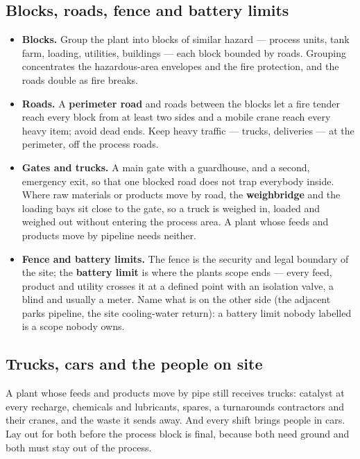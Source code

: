 \documentclass[11pt,a4paper]{article}
\providecommand{\tightlist}{\setlength{\itemsep}{0pt}\setlength{\parskip}{0pt}}
\begin{document}
\hypertarget{blocks-roads-fence-and-battery-limits}{%
\subsection{Blocks, roads, fence and battery
limits}\label{blocks-roads-fence-and-battery-limits}}

\begin{itemize}
\tightlist
\item
  \textbf{Blocks.} Group the plant into blocks of similar hazard ---
  process units, tank farm, loading, utilities, buildings --- each block
  bounded by roads. Grouping concentrates the hazardous-area envelopes
  and the fire protection, and the roads double as fire breaks.
\item
  \textbf{Roads.} A \textbf{perimeter road} and roads between the blocks
  let a fire tender reach every block from at least two sides and a
  mobile crane reach every heavy item; avoid dead ends. Keep heavy
  traffic --- trucks, deliveries --- at the perimeter, off the process
  roads.
\item
  \textbf{Gates and trucks.} A main gate with a guardhouse, and a second,
  emergency exit, so that one blocked road does not trap everybody
  inside. Where raw materials or products move by road, the
  \textbf{weighbridge} and the loading bays sit close to the gate, so a
  truck is weighed in, loaded and weighed out without entering the
  process area. A plant whose feeds and products move by pipeline needs
  neither.
\item
  \textbf{Fence and battery limits.} The fence is the security and legal
  boundary of the site; the \textbf{battery limit} is where the
  plant\textquotesingle s scope ends --- every feed, product and utility
  crosses it at a defined point with an isolation valve, a blind and
  usually a meter. Name what is on the other side (the adjacent
  park\textquotesingle s pipeline, the site cooling-water return): a
  battery limit nobody labelled is a scope nobody owns.
\end{itemize}

\hypertarget{trucks-cars-and-the-people-on-site}{%
\subsection{Trucks, cars and the people on
site}\label{trucks-cars-and-the-people-on-site}}

A plant whose feeds and products move by pipe still receives trucks:
catalyst at every recharge, chemicals and lubricants, spares, a
turnaround\textquotesingle s contractors and their cranes, and the waste
it sends away. And every shift brings people in cars. Lay out for both
before the process block is final, because both need ground and both
must stay out of the process.
\end{document}
